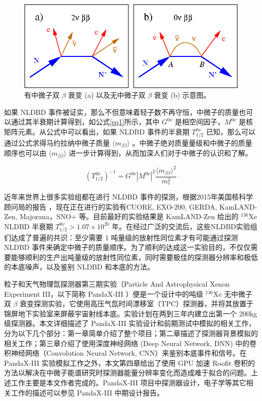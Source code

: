 \begin{figure}
    \centering
    \includegraphics[width=0.5\columnwidth]{pic/nldbd.png}
    \caption{有中微子双 $\beta$ 衰变 (a) 以及无中微子双 $\beta$ 衰变 (b) 示意图。}
    \label{fig:nldbd}
\end{figure}

如果 NLDBD 事件被证实，那么不但意味着轻子数不再守恒，中微子的质量也可以通过其半衰期计算得到，如公式\ref{eq1}所示\supercite{avignone2008double}，其中 $G^{0\nu}$ 是相空间因子，$M^{0\nu}$ 是核矩阵元素。从公式中可以看出，如果 NLDBD 事件的半衰期 $T^{0\nu}_{1/2}$ 已知，那么可以通过公式求得马约拉纳中微子质量 $\langle m_{\beta\beta}\rangle$ 。中微子绝对质量量级和中微子的质量顺序也可以由 $\langle m_{\beta\beta}\rangle$ 进一步计算得到，从而加深人们对于中微子的认识和了解。

\begin{equation}
    (T_{1/2}^{0\nu})^{-1}=G^{0\nu}|M^{0\nu}|^2\frac{\langle m_{\beta\beta}\rangle ^2}{m_e^2}
    \label{eq1}
\end{equation}

近年来世界上很多实验组都在进行 NLDBD 事件的探测，根据2015年美国核科学顾问局的报告 \supercite{NLDBD_NSAC}，现在正在进行的实验有CUORE\supercite{Artusa:2014lgv}, EXO-200\supercite{Albert:2014awa}, GERDA\supercite{Agostini:2016iid}, KamLAND-Zen\supercite{KamLAND-Zen:2016pfg}, Majorana\supercite{Abgrall:2013rze}，SNO+\supercite{Andringa:2015tza} 等。目前最好的实验结果是 KamLAND-Zen 给出的 $^{136}$Xe NLDBD 半衰期 $T^{0\nu}_{1/2}>1.07\times10^{26}$ 年。在经过广泛的交流后，这些NLDBD实验组们达成了普遍的共识：至少需要 1 吨量级的放射性同位素才有可能通过探测 NLDBD 事件来确定中微子的质量顺序。为了顺利的达成这一实验目的，不仅仅需要能够顺利的生产出吨量级的放射性同位素，同时需要极佳的探测器分辨率和极低的本底噪声，以及鉴别 NLDBD 
和本底的方法。

粒子和天气物理氙探测器第三期实验（Particle And Astrophysical Xenon Experiment III，以下简称 PandaX-III ）便是一个设计中的吨级 $^{136}$Xe 无中微子双 $\beta$ 衰变探测实验，它使用高压气氙时间漂移室（TPC）探测器，并将其放置于锦屏地下实验室来屏蔽宇宙射线本底。实验计划在两到三年内建立出第一个 200kg 级探测器。本文详细描述了 PandaX-III 实验设计和前期测试中模拟的相关工作，分为以下几个部分：第一章简单介绍了整个项目；第二章描述了探测器背景模拟的相关工作；第三章介绍了使用深度神经网络 (Deep Neural Network, DNN) 中的卷积神经网络（Convolution Neural Network, CNN）来鉴别本底事件和信号。在 PandaX-III 实验模拟工作之外，本文第四章给出了使用 GPU 加速 Roofit 卷积的方法以解决在中微子能谱研究时探测器能量分辨率变化而造成难于拟合的问题。上述工作主要是本文作者完成的。PandaX-III 项目中探测器设计，电子学等其它相关工作的描述可以参见 PandaX-III 中期设计报告\supercite{cdr}。

